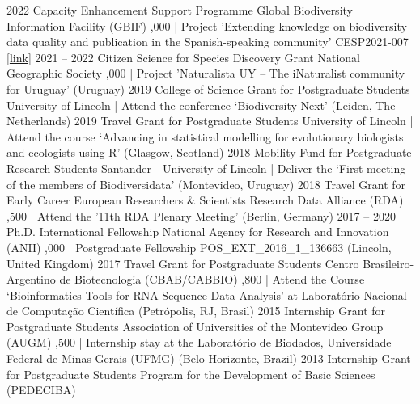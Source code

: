 \documentclass[9pt]{developercv} %
\begin{document}
\hfill \break


\begin{entrylist}
	\entry
		{2022}
		{Capacity Enhancement Support Programme}
		{Global Biodiversity Information Facility (GBIF)}
		{,000 | Project 'Extending knowledge on biodiversity data quality and publication in the Spanish-speaking community' CESP2021-007 [\href{https://www.gbif.org/project/CESP2021-007/}{link}]}
	\entry
		{2021 -- 2022}
		{Citizen Science for Species Discovery Grant}
		{National Geographic Society}
		{,000 | Project 'Naturalista UY – The iNaturalist community for Uruguay' (Uruguay)}
	\entry
		{2019}
		{College of Science Grant for Postgraduate Students}
		{University of Lincoln }
		{ | Attend the conference ‘Biodiversity Next’ (Leiden, The Netherlands)}
	\entry
		{2019}
		{Travel Grant for Postgraduate Students}
		{University of Lincoln }
		{ | Attend the course ‘Advancing in statistical modelling for evolutionary biologists and ecologists using R’ (Glasgow, Scotland)}
	\entry
		{2018}
		{Mobility Fund for Postgraduate Research Students}
		{Santander - University of Lincoln}
		{ | Deliver the ‘First meeting of the members of Biodiversidata’ (Montevideo, Uruguay)}
	\entry
		{2018}
		{Travel Grant for Early Career European Researchers \& Scientists }
		{Research Data Alliance (RDA)}
		{,500 | Attend the '11th RDA Plenary Meeting’ (Berlin, Germany)}
	\entry
		{2017 -- 2020}
		{Ph.D. International Fellowship}
		{National Agency for Research and Innovation (ANII)}
		{,000 | Postgraduate Fellowship POS\_EXT\_2016\_1\_136663 (Lincoln, United Kingdom)}
	\entry
		{2017}
		{Travel Grant for Postgraduate Students}
		{Centro Brasileiro-Argentino de Biotecnologia (CBAB/CABBIO)}
		{,800 | Attend the Course ‘Bioinformatics Tools for RNA-Sequence Data Analysis’ at Laboratório Nacional de Computação Científica (Petrópolis, RJ, Brasil)}
	\entry
		{2015}
		{Internship Grant for Postgraduate Students}
		{Association of Universities of the Montevideo Group (AUGM)}
		{,500 | Internship stay at the Laboratório de Biodados, Universidade Federal de Minas Gerais (UFMG) (Belo Horizonte, Brazil)}
	\entry
		{2013}
		{Internship Grant for Postgraduate Students}
		{Program for the Development of Basic Sciences (PEDECIBA)}

\end{entrylist}
\end{document}

